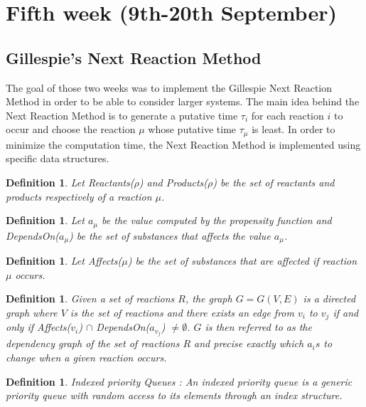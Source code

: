 \documentclass[11pt,a4paper]{article}
\newtheorem{defn}[theorem]{Definition}
\begin{document}
\section{Fifth week (9th-20th September)}
\subsection{Gillespie's Next Reaction Method}
The goal of those two weeks was to implement the Gillespie Next Reaction Method in order to be able to consider larger systems. The main idea behind the Next Reaction Method is to generate a putative time $\tau_i$ for each reaction $i$ to occur and choose the reaction $\mu$ whose putative time $\tau_{\mu}$ is least. In order to minimize the computation time, the Next Reaction Method is implemented using specific data structures.

\begin{defn}
Let Reactants($\rho$) and Products($\rho$) be the set of reactants and products respectively of a reaction $\mu$.
\end{defn}

\begin{defn} Let $a_{\mu}$ be the value computed by the propensity function and DependsOn($a_{\mu}$) be the set of substances that affects the value $a_{\mu}$.
\end{defn}

\begin{defn} Let Affects($\mu$) be the set of substances that are affected if reaction $\mu$ occurs.
\end{defn}

\begin{defn} \cite{gibson_efficient_2000} Given a set of reactions $R$, the graph $G = G(V, E)$ is a directed graph where $V$ is the set of reactions and there exists an edge from $v_i$ to $v_j$ if and only if  Affects($v_i$) $\cap$ DependsOn($a_{v_{j}}$) $\neq \emptyset$. $G$ is then referred to as the dependency graph of the set of reactions $R$ and precise exactly which $a_is$ to change when a given reaction occurs.
\end{defn}

\begin{defn} Indexed priority Queues : An indexed priority queue is a generic priority queue with random access to its elements through an index structure.
\end{defn}
\end{document}
